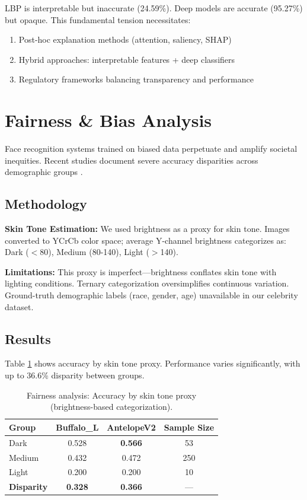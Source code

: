 \documentclass[11pt,a4paper]{article}
\begin{document}
LBP is interpretable but inaccurate (24.59\%). Deep models are accurate (95.27\%) but opaque. This fundamental tension necessitates:
\begin{enumerate}
    \item Post-hoc explanation methods (attention, saliency, SHAP)
    \item Hybrid approaches: interpretable features + deep classifiers
    \item Regulatory frameworks balancing transparency and performance
\end{enumerate}

\section{Fairness \& Bias Analysis}

Face recognition systems trained on biased data perpetuate and amplify societal inequities. Recent studies document severe accuracy disparities across demographic groups \cite{buolamwini2018gender,grother2019demographic}.

\subsection{Methodology}

\textbf{Skin Tone Estimation:} We used brightness as a proxy for skin tone. Images converted to YCrCb color space; average Y-channel brightness categorizes as: Dark ($<$80), Medium (80-140), Light ($>$140).

\textbf{Limitations:} This proxy is imperfect—brightness conflates skin tone with lighting conditions. Ternary categorization oversimplifies continuous variation. Ground-truth demographic labels (race, gender, age) unavailable in our celebrity dataset.

\subsection{Results}

Table \ref{tab:fairness} shows accuracy by skin tone proxy. Performance varies significantly, with up to 36.6\% disparity between groups.

\begin{table}[H]
\centering
\caption{Fairness analysis: Accuracy by skin tone proxy (brightness-based categorization).}
\label{tab:fairness}
\begin{tabular}{@{}lccc@{}}
\toprule
\textbf{Group} & \textbf{Buffalo\_L} & \textbf{AntelopeV2} & \textbf{Sample Size} \\ \midrule
Dark & 0.528 & \textbf{0.566} & 53 \\
Medium & 0.432 & 0.472 & 250 \\
Light & \textcolor{accent}{0.200} & \textcolor{accent}{0.200} & \textcolor{accent}{10} \\ \midrule
\textbf{Disparity} & \textbf{0.328} & \textbf{0.366} & --- \\ \bottomrule
\end{tabular}
\end{table}
\end{document}
